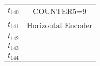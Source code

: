 \begin{table}[htbp]
\begin{tabular}{c|c}
\hyperlink{partialNet:t140}{\hypertarget{partialTable:t140}{$t_{140}$}} & COUNTER5=9\\
\hyperlink{partialNet:t141}{\hypertarget{partialTable:t141}{$t_{141}$}} & Horizontal Encoder\\
\hyperlink{partialNet:t142}{\hypertarget{partialTable:t142}{$t_{142}$}} & \\
\hyperlink{partialNet:t143}{\hypertarget{partialTable:t143}{$t_{143}$}} & \\
\hyperlink{partialNet:t144}{\hypertarget{partialTable:t144}{$t_{144}$}} & \\
\end{tabular}
\end{table}
